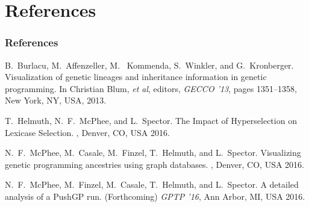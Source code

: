 \documentclass{beamer}
\begin{document}

\section*{References}

\begin{frame} 
	\frametitle{References} 
	
	\begin{thebibliography}{lskdjf}
	\small 
B.~Burlacu, M.~Affenzeller, M.~	Kommenda, S.~Winkler, and G.~Kronberger.
\newblock Visualization of genetic lineages and inheritance
information in genetic programming.
\newblock In Christian Blum, \emph{et al}, editors, {\em GECCO '13}, pages 1351--1358, New York, NY, USA, 2013.
	
	T.~Helmuth, N.~F.~McPhee, and L.~Spector.
\newblock The Impact of Hyperselection on Lexicase Selection.
, Denver, CO, USA 2016.
  
	N.~F.~McPhee, M.~Casale, M.~Finzel, T.~Helmuth, and L.~Spector.
\newblock Visualizing genetic programming ancestries using graph databases.
, Denver, CO, USA 2016.
	
	N.~F.~McPhee, M.~Finzel, M.~Casale, T.~Helmuth, and L.~Spector.
\newblock A detailed analysis of a PushGP run.
\newblock (Forthcoming) {\em GPTP '16}, Ann Arbor, MI, USA 2016.
	

  
  	\end{thebibliography}
	
\end{frame} 
\end{document}
